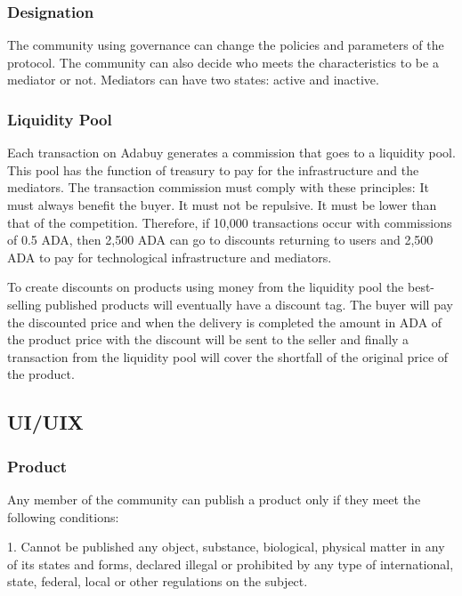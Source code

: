 \documentclass[12pt]{article}
\begin{document}
\subsubsection { Designation } 

The community using governance can change the policies and parameters of the protocol. The community can also decide who meets the characteristics to be a mediator or not.
Mediators can have two states: active and inactive.

\subsubsection { Liquidity Pool }

Each transaction on Adabuy generates a commission that goes to a liquidity pool. This pool has the function of treasury to pay for the infrastructure and the mediators.
The transaction commission must comply with these principles: It must always benefit the buyer. It must not be repulsive. It must be lower than that of the competition. Therefore, if 10,000 transactions occur with commissions of 0.5 ADA, then 2,500 ADA can go to discounts returning to users and 2,500 ADA to pay for technological infrastructure and mediators. 

To create discounts on products using money from the liquidity pool the best-selling published products will eventually have a discount tag. The buyer will pay the discounted price and when the delivery is completed the amount in ADA of the product price with the discount will be sent to the seller and finally a transaction from the liquidity pool will cover the shortfall of the original price of the product.

\subsection{ UI/UIX }

\subsubsection { Product } 

Any member of the community can publish a product only if they meet the following conditions:

1. Cannot be published any object, substance, biological, physical matter in any of its states and forms, declared illegal or prohibited by any type of international, state, federal, local or other regulations on the subject.
\end{document}
